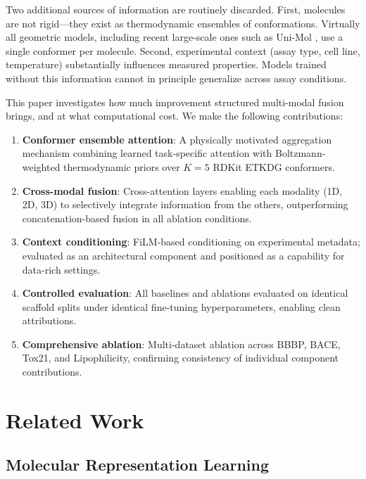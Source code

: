 \documentclass[11pt]{article}
\begin{document}
Two additional sources of information are routinely discarded. First, molecules are not rigid---they exist as thermodynamic ensembles of conformations. Virtually all geometric models, including recent large-scale ones such as Uni-Mol \citep{zhou2023unimol}, use a single conformer per molecule. Second, experimental context (assay type, cell line, temperature) substantially influences measured properties. Models trained without this information cannot in principle generalize across assay conditions.

This paper investigates how much improvement structured multi-modal fusion brings, and at what computational cost. We make the following contributions:

\begin{enumerate}[leftmargin=*,itemsep=2pt]
    \item \textbf{Conformer ensemble attention}: A physically motivated aggregation mechanism combining learned task-specific attention with Boltzmann-weighted thermodynamic priors over $K=5$ RDKit ETKDG conformers.
    \item \textbf{Cross-modal fusion}: Cross-attention layers enabling each modality (1D, 2D, 3D) to selectively integrate information from the others, outperforming concatenation-based fusion in all ablation conditions.
    \item \textbf{Context conditioning}: FiLM-based conditioning on experimental metadata; evaluated as an architectural component and positioned as a capability for data-rich settings.
    \item \textbf{Controlled evaluation}: All baselines and ablations evaluated on identical scaffold splits under identical fine-tuning hyperparameters, enabling clean attributions.
    \item \textbf{Comprehensive ablation}: Multi-dataset ablation across BBBP, BACE, Tox21, and Lipophilicity, confirming consistency of individual component contributions.
\end{enumerate}

\section{Related Work}
\label{sec:related}

\subsection{Molecular Representation Learning}
\end{document}
